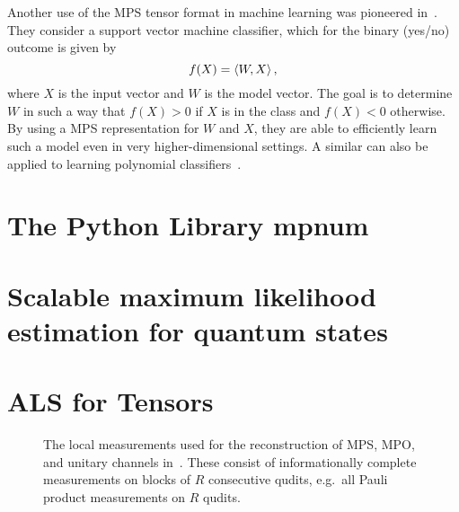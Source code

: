 Another use of the MPS tensor format in machine learning was pioneered in~\cite{Stoudenmire}.
They consider a support vector machine classifier, which for the binary (yes/no) outcome is given by
\[
  f(X) = \braket{W, X},
\]
where $X$ is the input vector and $W$ is the model vector.
The goal is to determine $W$ in such a way that $f(X) > 0$ if $X$ is in the  class and $f(X) < 0$ otherwise.
By using a MPS representation for $W$ and $X$, they are able to efficiently learn such a model even in very higher-dimensional settings.
A similar can also be applied to learning polynomial classifiers~\cite{Chen}.


\section{The Python Library mpnum}%
\label{sec:tensors.mpnum}




\section{Scalable maximum likelihood estimation for quantum states}%
\label{sec:tensors.mle}

%

\section{ALS for Tensors}%
\label{sec:tensors.als}

\begin{figure*}
  \centering
  
  \caption{%
    The local measurements used for the reconstruction of MPS, MPO, and unitary channels in~\cite{Cramer_2010_Efficient,Baumgratz,Baumgratz,Lanyon,Holzaepfel}.
    These consist of informationally complete measurements on blocks of $R$ consecutive qudits, e.g.\ all Pauli product measurements on $R$ qudits.
    }%
  \label{fig:als.quantum_measurements}
\end{figure*}

